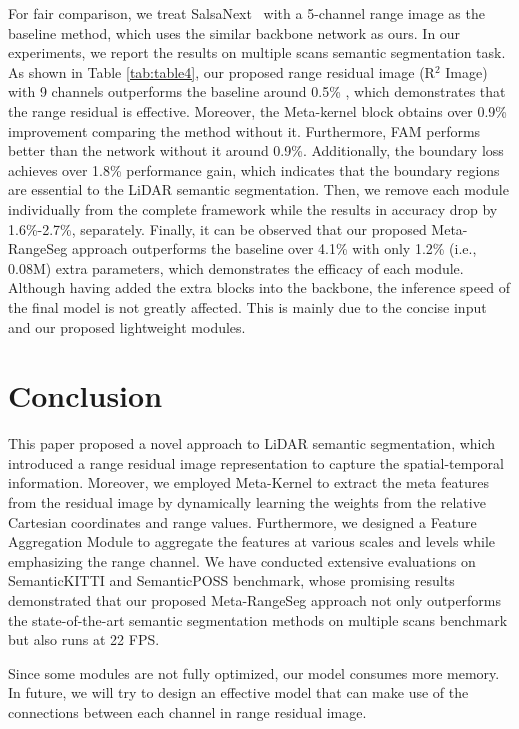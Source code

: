 \documentclass[letterpaper, 10 pt, journal, twoside]{ieeetran}
\begin{document}
For fair comparison, we treat SalsaNext~\cite{cortinhal2020salsanext} with a 5-channel range image as the baseline method, which uses the similar backbone network as ours. In our experiments, we report the results on multiple scans semantic segmentation task. As shown in Table \ref{tab:table4}, our proposed range residual image (R$^2$ Image) with 9 channels outperforms the baseline around 0.5\% , which demonstrates that the range residual is effective. Moreover, the Meta-kernel block obtains over 0.9\% improvement comparing the method without it. Furthermore, FAM performs better than the network without it around 0.9\%. Additionally, the boundary loss achieves over 1.8\% performance gain, which indicates that the boundary regions are essential to the LiDAR semantic segmentation. 
Then, we remove each module individually from the complete framework while the results in accuracy drop by 1.6\%-2.7\%, separately.
Finally, it can be observed that our proposed Meta-RangeSeg approach outperforms the baseline over 4.1\% with only 1.2\% (i.e., 0.08M) extra parameters, which demonstrates the efficacy of each module.  
Although having added the extra blocks into the backbone, the inference speed of the final model is not greatly affected. This is mainly due to the concise input and our proposed lightweight modules.






\section{Conclusion}
\label{sec:conclusion}

This paper proposed a novel approach to LiDAR semantic segmentation, which introduced a range residual image representation to capture the spatial-temporal information. Moreover, we employed Meta-Kernel to extract the meta features from the residual image by dynamically learning the weights from the relative Cartesian coordinates and range values. Furthermore, we designed a Feature Aggregation Module to aggregate the features at various scales and levels while emphasizing the range channel. We have conducted extensive evaluations on SemanticKITTI and SemanticPOSS benchmark, whose promising results demonstrated that our proposed Meta-RangeSeg approach not only outperforms the state-of-the-art semantic segmentation methods on multiple scans benchmark but also runs at 22 FPS. 

Since some modules are not fully optimized, our model consumes more memory. In future, we will try to design an effective model that can make use of the connections between each channel in range residual image.







\end{document}
